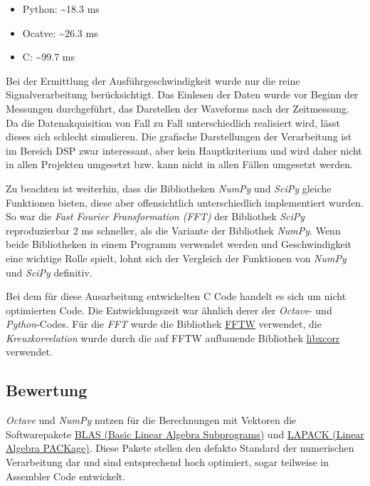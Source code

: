 \documentclass[11pt]{article}
\providecommand{\tightlist}{%
      \setlength{\itemsep}{0pt}\setlength{\parskip}{0pt}}
\begin{document}
\begin{itemize}
\tightlist
\item
  Python: \textasciitilde18.3 ms
\item
  Ocatve: \textasciitilde26.3 ms
\item
  C: \textasciitilde99.7 ms
\end{itemize}

Bei der Ermittlung der Ausführgeschwindigkeit wurde nur die reine
Signalverarbeitung berücksichtigt. Das Einlesen der Daten wurde vor
Beginn der Messungen durchgeführt, das Darstellen der Waveforms nach der
Zeitmessung. Da die Datenakquisition von Fall zu Fall unterschiedlich
realisiert wird, lässt dieses sich schlecht simulieren. Die grafische
Darstellungen der Verarbeitung ist im Bereich DSP zwar interessant, aber
kein Hauptkriterium und wird daher nicht in allen Projekten umgesetzt
bzw. kann nicht in allen Fällen umgesetzt werden.

Zu beachten ist weiterhin, dass die Bibliotheken \emph{NumPy} und
\emph{SciPy} gleiche Funktionen bieten, diese aber offensichtlich
unterschiedlich implementiert wurden. So war die \emph{Fast Fourier
Fransformation (FFT)} der Bibliothek \emph{SciPy} reproduzierbar 2 ms
schneller, als die Variante der Bibliothek \emph{NumPy}. Wenn beide
Bibliotheken in einem Programm verwendet werden und Geschwindigkeit eine
wichtige Rolle spielt, lohnt sich der Vergleich der Funktionen von
\emph{NumPy} und \emph{SciPy} definitiv.

Bei dem für diese Ausarbeitung entwickelten C Code handelt es sich um
nicht optimierten Code. Die Entwicklungszeit war ähnlich derer der
\emph{Octave}- und \emph{Python}-Codes. Für die \emph{FFT} wurde die
Bibliothek \href{http://fftw.org/}{FFTW} verwendet, die
\emph{Kreuzkorrelation} wurde durch die auf FFTW aufbauende Bibliothek
\href{https://github.com/dMaggot/libxcorr}{libxcorr} verwendet.

\hypertarget{bewertung}{%
\subsection{Bewertung}\label{bewertung}}

\emph{Octave} und \emph{NumPy} nutzen für die Berechnungen mit Vektoren
die Softwarepakete \href{http://www.netlib.org/blas/}{BLAS (Basic Linear
Algebra Subprograms)} und
\href{http://performance.netlib.org/lapack/}{LAPACK (Linear Algebra
PACKage)}. Diese Pakete stellen den defakto Standard der numerischen
Verarbeitung dar und sind entsprechend hoch optimiert, sogar teilweise
in Assembler Code entwickelt.
\end{document}
